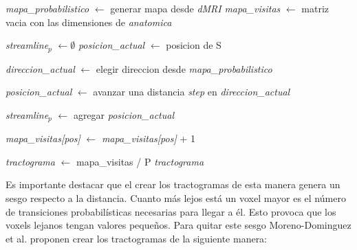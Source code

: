 \begin{algorithm}
\caption{Proceso de creaci\'on de un tractograma}\label{euclid}
\begin{algorithmic}[1]


\State \emph{mapa\_probabilistico} $\gets$ generar mapa desde \emph{dMRI} 
\State \emph{mapa\_visitas} $\gets$ matriz vacia con las dimensiones 
                                    de \emph{anatomica}


    \State \emph{streamline$_p$} $\gets \emptyset$
    \State \emph{posicion\_actual} $\gets$ posicion de S
    

        \State \emph{direccion\_actual} $\gets$ elegir direccion desde \emph{mapa\_probabilistico}
        
        \State \emph{posicion\_actual} $\gets$ avanzar una distancia \emph{step} en \emph{direccion\_actual} 
                
        \State \emph{streamline$_p$} $\gets$ agregar \emph{posicion\_actual}    
   
    \EndWhile
    
        \State \emph{mapa\_visitas[pos]} $\gets$ \emph{mapa\_visitas[pos]} + 1
    \EndFor        
    
\EndFor

\State \emph{tractograma} $\gets$ mapa\_visitas / P
\State \Return \emph{tractograma} 
 
\EndProcedure
\end{algorithmic}

\end{algorithm}

Es importante destacar que el crear los tractogramas de esta manera genera
un sesgo respecto a la distancia. Cuanto m\'as lejos est\'a un voxel mayor
es el n\'umero de transiciones probabil\'isticas necesarias para llegar a
\'el. Esto provoca que los voxels lejanos tengan valores peque\~nos. Para
quitar este sesgo Moreno-Dominguez et al. \cite{Moreno-Dominguez2014}
proponen crear los tractogramas de la siguiente manera:

